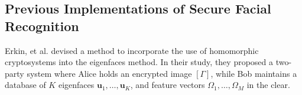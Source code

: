 




\subsection{Previous Implementations of Secure Facial Recognition}
Erkin, et al. \cite{hutchison_privacy-preserving_2009} devised a method to incorporate the use of homomorphic cryptosystems into the eigenfaces method. In their study, they proposed a two-party system where Alice holds an encrypted image $\left[\Gamma\right]$, while Bob maintains a database of $K$ eigenfaces $\mathbf{u}_1, \ldots, \mathbf{u}_K$, and feature vectors $\Omega_1, \ldots, \Omega_M$ in the clear.

